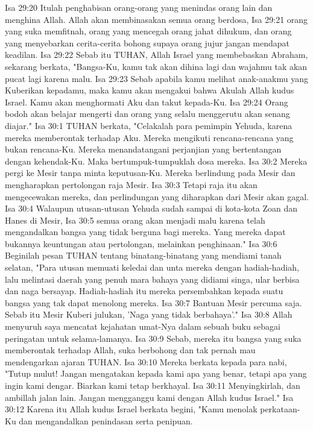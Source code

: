 Isa 29:20  Itulah penghabisan orang-orang yang menindas orang lain dan menghina Allah. Allah akan membinasakan semua orang berdosa,
Isa 29:21  orang yang suka memfitnah, orang yang mencegah orang jahat dihukum, dan orang yang menyebarkan cerita-cerita bohong supaya orang jujur jangan mendapat keadilan.
Isa 29:22  Sebab itu TUHAN, Allah Israel yang membebaskan Abraham, sekarang berkata, "Bangsa-Ku, kamu tak akan dihina lagi dan wajahmu tak akan pucat lagi karena malu.
Isa 29:23  Sebab apabila kamu melihat anak-anakmu yang Kuberikan kepadamu, maka kamu akan mengakui bahwa Akulah Allah kudus Israel. Kamu akan menghormati Aku dan takut kepada-Ku.
Isa 29:24  Orang bodoh akan belajar mengerti dan orang yang selalu menggerutu akan senang diajar."
Isa 30:1  TUHAN berkata, "Celakalah para pemimpin Yehuda, karena mereka memberontak terhadap Aku. Mereka mengikuti rencana-rencana yang bukan rencana-Ku. Mereka menandatangani perjanjian yang bertentangan dengan kehendak-Ku. Maka bertumpuk-tumpuklah dosa mereka.
Isa 30:2  Mereka pergi ke Mesir tanpa minta keputusan-Ku. Mereka berlindung pada Mesir dan mengharapkan pertolongan raja Mesir.
Isa 30:3  Tetapi raja itu akan mengecewakan mereka, dan perlindungan yang diharapkan dari Mesir akan gagal.
Isa 30:4  Walaupun utusan-utusan Yehuda sudah sampai di kota-kota Zoan dan Hanes di Mesir,
Isa 30:5  semua orang akan menjadi malu karena telah mengandalkan bangsa yang tidak berguna bagi mereka. Yang mereka dapat bukannya keuntungan atau pertolongan, melainkan penghinaan."
Isa 30:6  Beginilah pesan TUHAN tentang binatang-binatang yang mendiami tanah selatan, "Para utusan memuati keledai dan unta mereka dengan hadiah-hadiah, lalu melintasi daerah yang penuh mara bahaya yang didiami singa, ular berbisa dan naga bersayap. Hadiah-hadiah itu mereka persembahkan kepada suatu bangsa yang tak dapat menolong mereka.
Isa 30:7  Bantuan Mesir percuma saja. Sebab itu Mesir Kuberi julukan, 'Naga yang tidak berbahaya'."
Isa 30:8  Allah menyuruh saya mencatat kejahatan umat-Nya dalam sebuah buku sebagai peringatan untuk selama-lamanya.
Isa 30:9  Sebab, mereka itu bangsa yang suka memberontak terhadap Allah, suka berbohong dan tak pernah mau mendengarkan ajaran TUHAN.
Isa 30:10  Mereka berkata kepada para nabi, "Tutup mulut! Jangan mengatakan kepada kami apa yang benar, tetapi apa yang ingin kami dengar. Biarkan kami tetap berkhayal.
Isa 30:11  Menyingkirlah, dan ambillah jalan lain. Jangan mengganggu kami dengan Allah kudus Israel."
Isa 30:12  Karena itu Allah kudus Israel berkata begini, "Kamu menolak perkataan-Ku dan mengandalkan penindasan serta penipuan.
